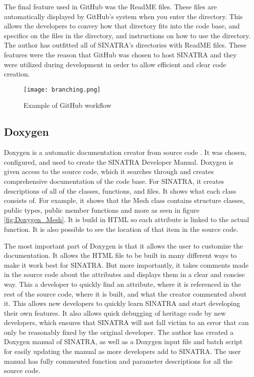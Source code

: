 \indent The final feature used in GitHub was the ReadME files. These files are automatically displayed by GitHub's system when you enter the directory. This allows the developers to convey how that directory fits into the code base, and specifics on the files in the directory, and instructions on how to use the directory. The author has outfitted all of SINATRA's directories with ReadME files. These features were the reason that GitHub was chosen to host SINATRA and they were utilized during development in order to allow efficient and clear code creation.


\begin{figure}
\texttt{[image: branching.png]}
\centering
\caption{Example of GitHub workflow}
\label{fig:github}
\end{figure}


\subsection{Doxygen}
Doxygen is a automatic documentation creator from source code \cite{doxygen}. It was chosen, configured, and used to create the SINATRA Developer Manual. Doxygen is given access to the source code, which it searches through and creates comprehensive documentation of the code base. For SINATRA, it creates descriptions of all of the classes, functions, and files. It shows what each class consists of. For example, it shows that the Mesh class contains structure classes, public types, public member functions and more as seen in figure \ref{fig:Doxygen_Mesh}. It is build in HTML so each attribute is linked to the actual function. It is also possible to see the location of that item in the source code. \par
\indent The most important part of Doxygen is that it allows the user to customize the documentation. It allows the HTML file to be built in many different ways to make it work best for SINATRA. But more importantly, it takes comments made in the source code about the attributes and displays them in a clear and concise way. This a developer to quickly find an attribute, where it is referenced in the rest of the source code, where it is built, and what the creator commented about it. This allows new developers to quickly learn SINATRA and start developing their own features. It also allows quick debugging of heritage code by new developers, which ensures that SINATRA will not fall victim to an error that can only be reasonably fixed by the original developer. The author has created a Doxygen manual of SINATRA, as well as a Doxygen input file and batch script for easily updating the manual as more developers add to SINATRA. The user manual has fully commented function and parameter descriptions for all the source code.


